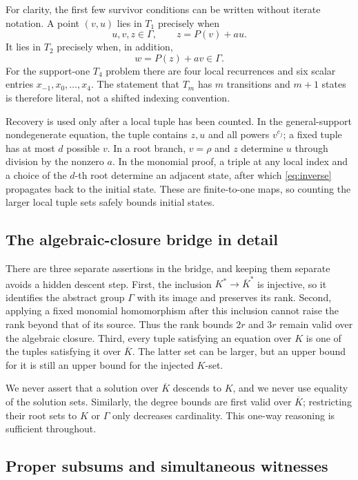 \documentclass[11pt]{article}
\theoremstyle{definition}
\begin{document}
For clarity, the first few survivor conditions can be written without iterate notation. A point \((v,u)\) lies in \(T_1\) precisely when
\[
 u,v,z\in\Gamma,\qquad z=P(v)+au.
\]
It lies in \(T_2\) precisely when, in addition,
\[
 w=P(z)+av\in\Gamma.
\]
For the support-one \(T_4\) problem there are four local recurrences and six scalar entries \(x_{-1},x_0,\ldots,\allowbreak x_4\). The statement that \(T_m\) has \(m\) transitions and \(m+1\) states is therefore literal, not a shifted indexing convention.

Recovery is used only after a local tuple has been counted. In the general-support nondegenerate equation, the tuple contains \(z,u\) and all powers \(v^{e_j}\); a fixed tuple has at most \(d\) possible \(v\). In a root branch, \(v=\rho\) and \(z\) determine \(u\) through division by the nonzero \(a\). In the monomial proof, a triple at any local index and a choice of the \(d\)-th root determine an adjacent state, after which \eqref{eq:inverse} propagates back to the initial state. These are finite-to-one maps, so counting the larger local tuple sets safely bounds initial states.

\subsection{The algebraic-closure bridge in detail}

There are three separate assertions in the bridge, and keeping them separate avoids a hidden descent step. First, the inclusion \(K^*\to\overline K^*\) is injective, so it identifies the abstract group \(\Gamma\) with its image and preserves its rank. Second, applying a fixed monomial homomorphism after this inclusion cannot raise the rank beyond that of its source. Thus the rank bounds \(2r\) and \(3r\) remain valid over the algebraic closure. Third, every tuple satisfying an equation over \(K\) is one of the tuples satisfying it over \(\overline K\). The latter set can be larger, but an upper bound for it is still an upper bound for the injected \(K\)-set.

We never assert that a solution over \(\overline K\) descends to \(K\), and we never use equality of the solution sets. Similarly, the degree bounds are first valid over \(\overline K\); restricting their root sets to \(K\) or \(\Gamma\) only decreases cardinality. This one-way reasoning is sufficient throughout.

\subsection{Proper subsums and simultaneous witnesses}
\end{document}
